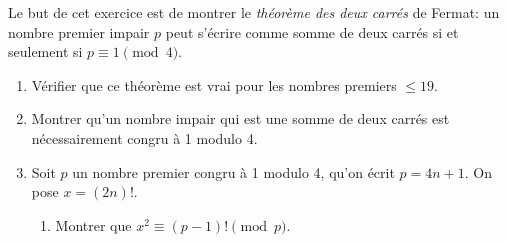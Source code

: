 
\begin{td-exo} %
    Le but de cet exercice est de montrer le
    \emph{théorème des deux carrés} de Fermat:
    un nombre premier impair \(p\) peut s'écrire comme
    somme de deux carrés si et seulement si \(p\equiv 1\pmod 4\).
    \begin{enumerate}
        \item Vérifier que ce théorème est vrai pour les nombres
        premiers \(\leq 19\).

        \item Montrer qu'un nombre impair qui est une somme de deux carrés
        est nécessairement congru à 1 modulo 4.

        \item Soit \(p\) un nombre premier congru à 1 modulo 4,
        qu'on écrit \(p = 4n + 1\). On pose \(x = {(2n)}!\). %

            \begin{enumerate}
                \item Montrer que \(x^2 \equiv (p-1)!\pmod p\).
            \end{enumerate}
    \end{enumerate}
\end{td-exo}

